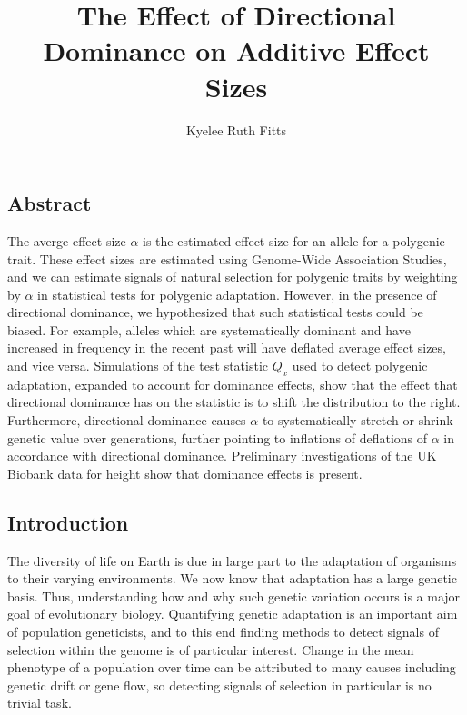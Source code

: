 \documentclass[a4paper,12pt]{article}
\begin{document}
\title{\vspace{-2cm}
  The Effect of Directional Dominance on Additive Effect Sizes
}
\author{Kyelee Ruth Fitts}
\maketitle


\subsection*{Abstract}
The averge effect size $\alpha$ is the estimated effect size for an
allele for a polygenic trait. These effect sizes are estimated using
Genome-Wide Association Studies, and we can estimate signals of natural
selection for polygenic traits by weighting by $\alpha$ in statistical
tests for polygenic adaptation. However, in the presence of
directional dominance, we hypothesized that such statistical tests
could be biased. For example, alleles which are systematically
dominant and have increased in frequency in the recent past will have
deflated average effect sizes, and vice versa. Simulations of the test
statistic $Q_x$ used to detect polygenic adaptation, expanded to
account for dominance effects, show that the effect that directional
dominance has on the statistic is to shift the distribution to the
right. Furthermore, directional dominance causes $\alpha$ to
systematically stretch or shrink genetic value over generations,
further pointing to inflations of deflations of $\alpha$ in accordance
with directional dominance. Preliminary investigations of the UK
Biobank data for height show that dominance effects is present.


\subsection*{Introduction}

The diversity of life on Earth is due in large part to the
adaptation of organisms to their varying environments. We now know that
adaptation has a large genetic basis. Thus, understanding how and why such
genetic variation occurs is a major goal of evolutionary
biology. Quantifying genetic adaptation is an important aim of population
geneticists, and to this end finding methods to detect signals of
selection within the genome is of particular interest. Change in the
mean phenotype of a population over time can be attributed to many causes including genetic
drift or gene flow, so detecting signals of selection in
particular is no trivial task.
\end{document}
